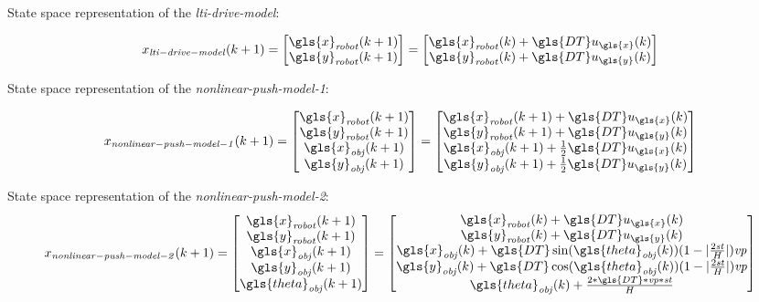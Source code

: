 State space representation of the \textit{lti-drive-model}:\bs

\begin{equation}
\label{eq:lti-drive-model}
x_{\mathit{lti-drive-model}}(k+1)=
\begin{bmatrix}
\gls{x}_\mathit{robot}(k+1)\\
\gls{y}_\mathit{robot}(k+1)
\end{bmatrix}
=
\begin{bmatrix}
\gls{x}_{\mathit{robot}}(k) + \gls{DT} u_{\gls{x}}(k)\\
\gls{y}_{\mathit{robot}}(k) + \gls{DT} u_{\gls{y}}(k)
\end{bmatrix}
\end{equation}

State space representation of the \textit{nonlinear-push-model-1}:\bs

\begin{equation}
x_{\mathit{nonlinear-push-model-1}}(k+1)=
\begin{bmatrix}
\gls{x}_{\mathit{robot}}(k+1)\\
\gls{y}_{\mathit{robot}}(k+1)\\
\gls{x}_{\mathit{obj}}(k+1)\\
\gls{y}_{\mathit{obj}}(k+1)
\end{bmatrix}
=
\begin{bmatrix}
\gls{x}_{\mathit{robot}}(k+1) + \gls{DT} u_{\gls{x}}(k)\\
\gls{y}_{\mathit{robot}}(k+1) + \gls{DT} u_{\gls{y}}(k)\\
\gls{x}_{\mathit{obj}}(k+1) + \frac{1}{2} \gls{DT} u_{\gls{x}}(k)\\
\gls{y}_{\mathit{obj}}(k+1) + \frac{1}{2} \gls{DT} u_{\gls{y}}(k)
\end{bmatrix}
\label{eq:nonlinear-push-model-1}
\end{equation}


State space representation of the \textit{nonlinear-push-model-2}:\bs
\begin{equation}
x_{\mathit{nonlinear-push-model-2}}(k+1)=
\begin{bmatrix}
\gls{x}_{\mathit{robot}}(k+1)\\
\gls{y}_{\mathit{robot}}(k+1)\\
\gls{x}_{\mathit{obj}}(k+1)\\
\gls{y}_{\mathit{obj}}(k+1)\\
\gls{theta}_{\mathit{obj}}(k+1)
\end{bmatrix}
=
\begin{bmatrix}
\gls{x}_{\mathit{robot}}(k) + \gls{DT} u_{\gls{x}}(k)\\
\gls{y}_{\mathit{robot}}(k) + \gls{DT} u_{\gls{y}}(k)\\
\gls{x}_{\mathit{obj}}(k) + \gls{DT}\sin(\gls{theta}_{\mathit{obj}}(k)) (1-|\frac{2\mathit{st}}{H}|)\mathit{vp}\\
\gls{y}_{\mathit{obj}}(k) + \gls{DT}\cos(\gls{theta}_{\mathit{obj}}(k)) (1-|\frac{2\mathit{st}}{H}|)\mathit{vp}\\
\gls{theta}_{\mathit{obj}}(k) + \frac{2*\gls{DT}*\mathit{vp}*\mathit{st}}{H}
\end{bmatrix}
\label{eq:nonlinear-push-model-2}
\end{equation}

